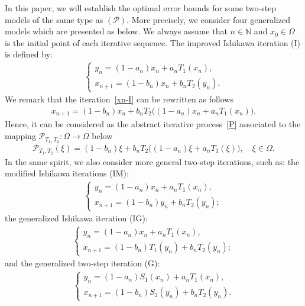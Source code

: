 \documentclass[a4paper, 11pt]{article}
\begin{document}
In this paper, we will establish the optimal error bounds for some two-step models of the same type as $(\mathcal{P})$. More precisely, we consider four generalized models which are presented as below. We always assume that $n \in \mathbb{N}$ and $x_0 \in \Omega$ is the initial point of each iterative sequence. The improved Ishikawa iteration (I) is defined by:		
\begin{align}\tag{I}\label{xn-I}
\begin{cases} y_{n} = (1-a_n)x_n + a_nT_1(x_n), \\ x_{n+1} = (1-b_n)x_n + b_nT_2(y_n).\end{cases}
\end{align}
We remark that the iteration~\eqref{xn-I} can be rewritten as follows
\begin{align*}
x_{n+1} = (1-b_n)x_n + b_nT_2\big((1-a_n)x_n + a_nT_1(x_n)\big).
\end{align*}
Hence, it can be considered as the abstract iterative process~\eqref{P} associated to the mapping $\mathcal{P}_{T_1,T_2}: \Omega \to \Omega$ below
\begin{align*}
\mathcal{P}_{T_1,T_2}(\xi) = (1-b_n)\xi + b_nT_2\big((1-a_n)\xi + a_nT_1(\xi)\big), \quad \xi \in \Omega.
\end{align*}
In the same spirit, we also consider more general two-step iterations, such as: the modified Ishikawa iterations (IM):	
\begin{align}\tag{IM}\label{xn-IM}
\begin{cases} y_{n} = (1-a_n)x_n + a_nT_1(x_n), \\ x_{n+1} = (1-b_n)y_n + b_nT_2(y_n);\end{cases}
\end{align}
the generalized Ishikawa iteration (IG):
\begin{align}\tag{IG}\label{xn-IG}
\begin{cases} y_{n} = (1-a_n)x_n + a_nT_1(x_n), \\ x_{n+1} = (1-b_n)T_1(y_n) + b_nT_2(y_n); \end{cases}
\end{align}
and the generalized two-step iteration (G):
\begin{align}\tag{G}\label{xn-G}
\begin{cases} y_{n} = (1-a_n)S_1(x_n) + a_nT_1(x_n), \\ x_{n+1} = (1-b_n)S_2(y_n) + b_nT_2(y_n).\end{cases}	
\end{align} 
		
\end{document}
